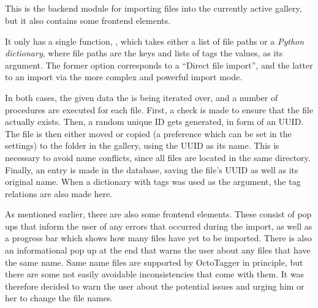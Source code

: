 \subsection{}
\def\kapitelautor{Erik Ritschl}

This is the backend module for importing files into the currently active
gallery, but it also contains some frontend elements.

It only has a single function, , which takes either a
list of file paths or a \emph{Python dictionary}, where file paths are the keys and
lists of tags the values, as its argument. The former option corresponds to a
``Direct file import'', and the latter to an import via the more complex and
powerful import mode.

In both cases, the given data the is being iterated over, and a number of
procedures are executed for each file. First, a check is made to ensure that
the file actually exists. Then, a random unique ID gets generated, in form of
an UUID. The file is then either moved or copied (a preference
which can be set in the settings) to the  folder in the gallery,
using the UUID as its name. This is necessary to avoid name
conflicts, since all files are located in the same directory. Finally, an entry
is made in the database, saving the file's UUID as well as its
original name. When a dictionary with tags was used as the argument, the tag relations
are also made here.

As mentioned earlier, there are also some frontend elements. These consist of
pop ups that inform the user of any errors that occurred during the import, as
well as a progress bar which shows how many files have yet to be imported.
There is also an informational pop up at the end that warns the user about any
files that have the same name. Same name files are supported by OctoTagger in
principle, but there are some not easily avoidable inconsistencies that come
with them. It was therefore decided to warn the user about the potential issues
and urging him or her to change the file names.
